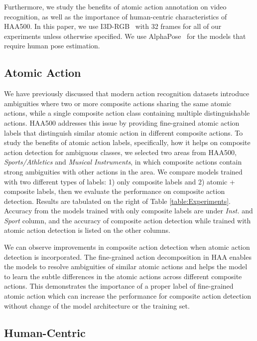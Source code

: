 \documentclass[10pt,twocolumn,letterpaper]{article}
\begin{document}
Furthermore, we study the benefits of atomic action annotation on video recognition, as well as  the importance of human-centric characteristics of HAA500.
In this paper, we use I3D-RGB~\cite{i3d} with 32 frames for all of our experiments unless otherwise specified. We use AlphaPose~\cite{alphapose} for the models that require human pose estimation. 


\subsection{Atomic Action}
We have previously discussed that modern action recognition datasets introduce ambiguities where two or more composite actions sharing the same atomic actions, while a single composite action class containing multiple distinguishable actions. HAA500 addresses this issue by providing fine-grained atomic action labels that distinguish similar atomic action in different composite actions. To study the benefits of atomic action labels, specifically, how it helps on composite action detection for ambiguous classes, we selected two areas from HAA500, \textit{Sports/Athletics} and \textit{Musical Instruments}, in which composite actions contain strong ambiguities with other actions in the area. We compare models trained with two different types of labels: 1) only composite labels and 2) atomic + composite labels, then we evaluate the performance on composite action detection. Results are tabulated on the right of Table \ref{table:Experiments}. Accuracy from the models trained with only composite labels are under \textit{Inst.} and \textit{Sport} column, and the accuracy of composite action detection while trained with atomic action detection is listed on the other columns. 

We can observe improvements in composite action detection when atomic action detection is incorporated. The fine-grained action decomposition in HAA enables the models to resolve ambiguities of similar atomic actions and helps the model to learn the subtle differences in the atomic actions across different composite actions. 
This demonstrates the importance of a proper label of fine-grained atomic action which can increase the performance for composite action detection without change of the model architecture or the training set. 




\subsection{Human-Centric}
\end{document}
